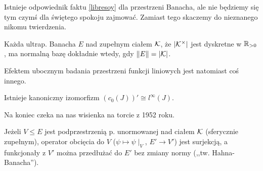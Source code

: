 Istnieje odpowiednik faktu \ref{libresoy} dla przestrzeni Banacha, ale nie będziemy się tym czymś dla świętego spokoju zajmować.
Zamiast tego skaczemy do nieznanego nikomu twierdzenia.

\begin{twierdzenie}
	Każda ultrap. Banacha $E$ nad zupełnym ciałem $\mathcal K$, że $|\mathcal K^\times|$ jest dyskretne w $\mathbb R_{> 0}$, ma normalną bazę dokładnie wtedy, gdy $\|E\| = |\mathcal K|$.
\end{twierdzenie}

Efektem ubocznym badania przestrzeni funkcji liniowych jest natomiast coś innego.

\begin{wniosek}
	Istnieje kanoniczny izomorfizm $(c_0(J))' \cong l^\infty(J)$.
\end{wniosek}

Na koniec czeka na nas wisienka na torcie z 1952 roku.

\begin{twierdzenie}[Ingleton]
	Jeżeli $V \le E$ jest podprzestrzenią p. unormowanej nad ciałem $\mathcal K$ (sferycznie zupełnym), operator obcięcia do $V$ ($\psi \mapsto \psi \mid_V$, $E' \to V'$) jest surjekcją, a funkcjonały z $V'$ można przedłużać do $E'$ bez zmiany normy (,,tw. Hahna-Banacha'').
\end{twierdzenie}